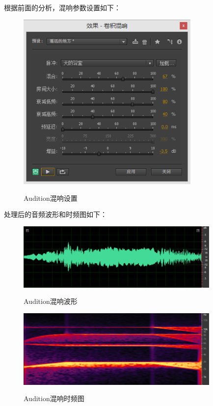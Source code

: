 \documentclass{article}
\begin{document}
            根据前面的分析，混响参数设置如下：
            \begin{figure}[htb]
                \centering
                \includegraphics[width=9cm]{figure13.png}
                \label{fig:reverb1-1}\caption{Audition混响设置}
            \end{figure}
            
            处理后的音频波形和时频图如下：
            \begin{figure}[htb]
                \centering
                \includegraphics[width=10cm]{figure14.png}
                \label{fig:reverb1-2}\caption{Audition混响波形}
            \end{figure}
            \begin{figure}[htb]
                \centering
                \includegraphics[width=10cm]{figure15.png}
                \label{fig:reverb1-3}\caption{Audition混响时频图}
            \end{figure}
            
\end{document}
